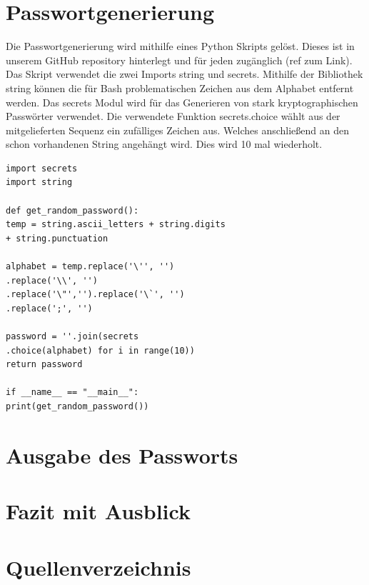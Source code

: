 \documentclass[a4paper,11pt,singlespacing]{article}
\begin{document}
                
            
    	\section{Passwortgenerierung}
    		Die Passwortgenerierung wird mithilfe eines Python Skripts gelöst. Dieses ist in unserem GitHub repository hinterlegt und für jeden zugänglich (ref zum Link). Das Skript verwendet die zwei Imports string und secrets. Mithilfe der Bibliothek string können die für Bash problematischen Zeichen aus dem Alphabet entfernt werden. Das secrets Modul wird für das Generieren von stark kryptographischen Passwörter verwendet. Die verwendete Funktion secrets.choice wählt aus der mitgelieferten Sequenz ein zufälliges Zeichen aus. Welches anschließend an den schon vorhandenen String angehängt wird. Dies wird 10 mal wiederholt.
    	
    	\lstset{
    			basicstyle=\ttfamily,
    			language=Python,
    		}
    	

            \begin{lstlisting}
import secrets
import string

def get_random_password():
temp = string.ascii_letters + string.digits 
+ string.punctuation

alphabet = temp.replace('\'', '')
.replace('\\', '')
.replace('\"','').replace('\`', '')
.replace(';', '')

password = ''.join(secrets
.choice(alphabet) for i in range(10))
return password

if __name__ == "__main__":
print(get_random_password())
            \end{lstlisting}
    	
    	\section{Ausgabe des Passworts}
    	
    	
    	
    	\section{Fazit mit Ausblick}
    	
    	\section{Quellenverzeichnis}
        
        
    	
\end{document}
